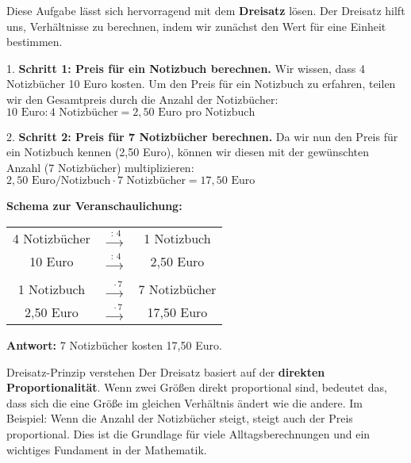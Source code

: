 \begin{loesungsumgebung}[loes:2.1]{} %
Diese Aufgabe lässt sich hervorragend mit dem \textbf{Dreisatz} lösen. Der Dreisatz hilft uns, Verhältnisse zu berechnen, indem wir zunächst den Wert für eine Einheit bestimmen.

1.  \textbf{Schritt 1: Preis für ein Notizbuch berechnen.}
    Wir wissen, dass 4 Notizbücher 10 Euro kosten. Um den Preis für ein Notizbuch zu erfahren, teilen wir den Gesamtpreis durch die Anzahl der Notizbücher:
    $10 \text{ Euro} : 4 \text{ Notizbücher} = 2,50 \text{ Euro pro Notizbuch}$

2.  \textbf{Schritt 2: Preis für 7 Notizbücher berechnen.}
    Da wir nun den Preis für ein Notizbuch kennen (2,50 Euro), können wir diesen mit der gewünschten Anzahl (7 Notizbücher) multiplizieren:
    $2,50 \text{ Euro/Notizbuch} \cdot 7 \text{ Notizbücher} = 17,50 \text{ Euro}$

\textbf{Schema zur Veranschaulichung:}

\begin{center}
\begin{tabular}{c c c}
    4 Notizbücher & $\xrightarrow{\text{ : } 4}$ & 1 Notizbuch \\
    10 Euro & $\xrightarrow{\text{ : } 4}$ & 2,50 Euro \\
    \quad \\ %
    1 Notizbuch & $\xrightarrow{\text{ } \cdot 7}$ & 7 Notizbücher \\
    2,50 Euro & $\xrightarrow{\text{ } \cdot 7}$ & 17,50 Euro \\
\end{tabular}
\end{center}

\vspace{0.5em} %

\textbf{Antwort:} 7 Notizbücher kosten 17,50 Euro.

\begin{tippumgebung}{Dreisatz-Prinzip verstehen}
Der Dreisatz basiert auf der \textbf{direkten Proportionalität}. Wenn zwei Größen direkt proportional sind, bedeutet das, dass sich die eine Größe im gleichen Verhältnis ändert wie die andere. Im Beispiel: Wenn die Anzahl der Notizbücher steigt, steigt auch der Preis proportional. Dies ist die Grundlage für viele Alltagsberechnungen und ein wichtiges Fundament in der Mathematik.
\end{tippumgebung}

\end{loesungsumgebung}

